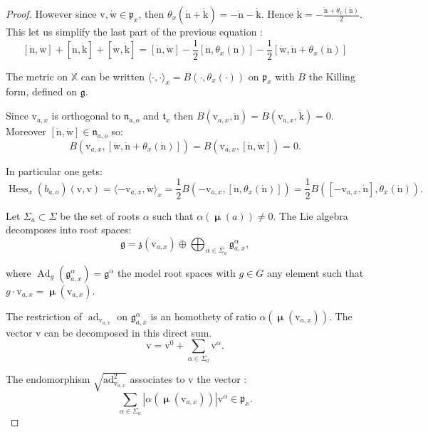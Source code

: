 \documentclass[reqno,10pt]{amsart}
\theoremstyle{plain}
\theoremstyle{definition}
\theoremstyle{remark}
\DeclareMathOperator{\Cartan}{\boldsymbol{\mu}}
\DeclareMathOperator{\Hess}{Hess}
\DeclareMathOperator{\ad}{ad}
\DeclareMathOperator{\Ad}{Ad}
\newcommand{\X}{\mathbb{X}}
\begin{document}
\begin{proof}
However since $\mathrm{v}, \dot{\mathrm{w}}\in \mathfrak{p}_x$, then $\theta_x(\dot{\mathrm{n}}+\dot{\mathrm{k}})=-\dot{\mathrm{n}}-\dot{\mathrm{k}}$. Hence $\dot{\mathrm{k}}=-\frac{\dot{\mathrm{n}}+\theta_x(\dot{\mathrm{n}})}{2}$. This let us simplify the last part of the previous equation :
$$[\dot{\mathrm{n}},\dot{\mathrm{w}}]+[\dot{\mathrm{n}},\dot{\mathrm{k}}]+[\dot{\mathrm{w}},\dot{\mathrm{k}}]=[\dot{\mathrm{n}},\dot{\mathrm{w}}]-\frac{1}{2}[\dot{\mathrm{n}},\theta_x(\dot{\mathrm{n}})]-\frac{1}{2}[\dot{\mathrm{w}},\dot{\mathrm{n}}+\theta_x(\dot{\mathrm{n}})]$$ 

The metric on $\X$ can be written $\langle \cdot,\cdot\rangle_x=B(\cdot, \theta_x(\cdot))$ on $\mathfrak{p}_x$ with $B$ the Killing form, defined on $\mathfrak{g}$.


Since $\mathrm{v}_{a,x}$ is orthogonal to $\mathfrak{n}_{a,o}$ and $\mathfrak{t}_x$ then $B(\mathrm{v}_{a,x},\ddot{\mathrm{n}})=B(\mathrm{v}_{a,x},\ddot{\mathrm{k}})=0$. Moreover $[\dot{\mathrm{n}},\dot{\mathrm{w}}]\in \mathfrak{n}_{a,o}$ so:
$$B(\mathrm{v}_{a,x},[\dot{\mathrm{w}},\dot{\mathrm{n}}+\theta_x(\dot{\mathrm{n}})])=B(\mathrm{v}_{a,x},[\dot{\mathrm{n}},\dot{\mathrm{w}}])=0.$$

In particular one gets:
$$\Hess_x(b_{a,o})(\mathrm{v},\mathrm{v})=\langle -\mathrm{v}_{a,x},\ddot{\mathrm{w}} \rangle_x=\frac{1}{2}B(-\mathrm{v}_{a,x},[\dot{\mathrm{n}},\theta_x(\dot{\mathrm{n}})])=\frac{1}{2}B([-\mathrm{v}_{a,x},\dot{\mathrm{n}}],\theta_x(\dot{\mathrm{n}})).$$

Let $\Sigma_a\subset \Sigma$ be the set of roots  $\alpha$ such that $\alpha(\Cartan(a))\neq 0$. The Lie algebra decomposes into root spaces:
$$\mathfrak{g}=\mathfrak{z}(\mathrm{v}_{a,x})\oplus\bigoplus_{\alpha\in \Sigma_a}\mathfrak{g}_{a,x}^\alpha,$$

where $\Ad_g(\mathfrak{g}_{a,x}^\alpha)=\mathfrak{g}^\alpha$ the model root spaces with $g\in G$ any element such that $g\cdot \mathrm{v}_{a,x}=\Cartan(\mathrm{v}_{a,x})$.

The restriction of $\ad_{\mathrm{v}_{a,x}}$ on $\mathfrak{g}_{a,x}^\alpha$ is an homothety of ratio $\alpha(\Cartan(\mathrm{v}_{a,x}))$. The vector $\mathrm{v}$ can be decomposed in this direct sum.
$$\mathrm{v}=\mathrm{v}^0+\sum_{ \alpha\in \Sigma_a}\mathrm{v}^\alpha.$$

The endomorphism $\sqrt{\ad_{\mathrm{v}_{a,x}}^2}$ associates to $\mathrm{v}$ the vector :
$$\sum_{ \alpha\in \Sigma_a}|\alpha(\Cartan(\mathrm{v}_{a,x}))|\mathrm{v}^\alpha\in \mathfrak{p}_x.$$


\end{proof}
\end{document}

